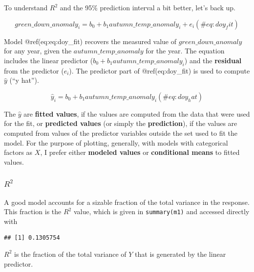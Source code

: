 \documentclass[]{book}
\newenvironment{Shaded}{\begin{snugshade}}{\end{snugshade}}
\newcommand{\KeywordTok}[1]{\textcolor[rgb]{0.13,0.29,0.53}{\textbf{#1}}}
\newcommand{\NormalTok}[1]{#1}
\newcommand{\OperatorTok}[1]{\textcolor[rgb]{0.81,0.36,0.00}{\textbf{#1}}}
\begin{document}
To understand \(R^2\) and the 95\% prediction interval a bit better, let's back up.

\begin{equation}
green\_down\_anomaly_i = b_0 + b_1 autumn\_temp\_anomaly_i + e_i
(\#eq:doy_fit)
\end{equation}

Model @ref(eq:eq:doy\_fit) recovers the measured value of \(green\_down\_anomaly\) for any year, given the \(autumn\_temp\_anomaly\) for the year. The equation includes the linear predictor (\(b_0 + b_1 autumn\_temp\_anomaly_i\)) and the \textbf{residual} from the predictor (\(e_i\)). The predictor part of @ref(eq:doy\_fit) is used to compute \(\hat{y}\) (``y hat'').

\begin{equation}
\hat{y}_i = b_0 + b_1 autumn\_temp\_anomaly_i
(\#eq:doy_hat)
\end{equation}

The \(\hat{y}\) are \textbf{fitted values}, if the values are computed from the data that were used for the fit, or \textbf{predicted values} (or simply the \textbf{prediction}), if the values are computed from values of the predictor variables outside the set used to fit the model. For the purpose of plotting, generally, with models with categorical factors as \(X\), I prefer either \textbf{modeled values} or \textbf{conditional means} to fitted values.

\hypertarget{r2}{%
\subsubsection{\texorpdfstring{\(R^2\)}{R\^{}2}}\label{r2}}

A good model accounts for a sizable fraction of the total variance in the response. This fraction is the \(R^2\) value, which is given in \texttt{summary(m1)} and accessed directly with

\begin{Shaded}
\end{Shaded}

\begin{verbatim}
## [1] 0.1305754
\end{verbatim}

\(R^2\) is the fraction of the total variance of \(Y\) that is generated by the linear predictor.
\end{document}
